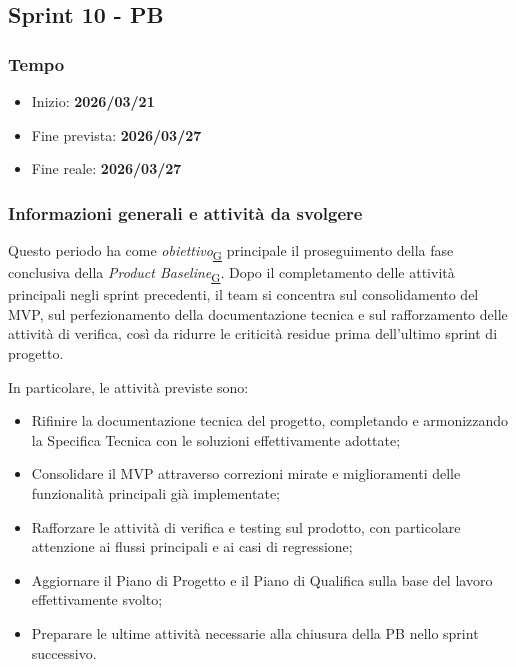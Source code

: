 \documentclass[a4paper,12pt]{article}
\begin{document}
\subsection{Sprint 10 - PB}{
    \subsubsection{Tempo}{
        \begin{itemize}
            \item[] Inizio: \textbf{2026/03/21} 
            \item[] Fine prevista: \textbf{2026/03/27} 
            \item[] Fine reale: \textbf{2026/03/27} 
        \end{itemize}
    }

    \subsubsection{Informazioni generali e attività da svolgere}{
        Questo periodo ha come \textit{obiettivo}\textsubscript{\href{https://atlasteam9.github.io/Atlas/glossario.html\#Obiettivo}{G}} principale il proseguimento della fase conclusiva della \textit{Product Baseline}\textsubscript{\href{https://atlasteam9.github.io/Atlas/glossario.html\#Baseline}{G}}. Dopo il completamento delle attività principali negli sprint precedenti, il team si concentra sul consolidamento del MVP, sul perfezionamento della documentazione tecnica e sul rafforzamento delle attività di verifica, così da ridurre le criticità residue prima dell'ultimo sprint di progetto.
    }
        
    \noindent In particolare, le attività previste sono:
        \begin{itemize}
            \item Rifinire la documentazione tecnica del progetto, completando e armonizzando la Specifica Tecnica con le soluzioni effettivamente adottate;
            \item Consolidare il MVP attraverso correzioni mirate e miglioramenti delle funzionalità principali già implementate;
            \item Rafforzare le attività di verifica e testing sul prodotto, con particolare attenzione ai flussi principali e ai casi di regressione;
            \item Aggiornare il Piano di Progetto e il Piano di Qualifica sulla base del lavoro effettivamente svolto;
            \item Preparare le ultime attività necessarie alla chiusura della PB nello sprint successivo.
        \end{itemize}
    }
\end{document}
